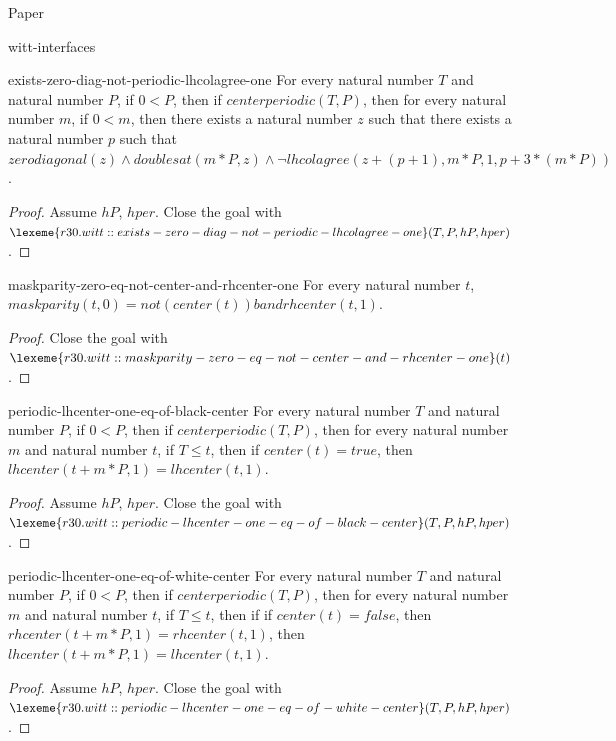 \begin{lexlean}{Paper}
\begin{section}{witt-interfaces}
  \begin{theorem}{exists-zero-diag-not-periodic-lhcolagree-one}
  For every natural number \(T\) and natural number \(P\), if \(0 < P\), then if \(centerperiodic(T, P)\), then for every natural number \(m\), if \(0 < m\), then there exists a natural number \(z\) such that there exists a natural number \(p\) such that \(zerodiagonal(z) ∧ doublesat(m * P, z) ∧ ¬lhcolagree(z + (p + 1), m * P, 1, p + 3 * (m * P))\).
  \begin{proof}
  Assume \(hP\), \(hper\).
  Close the goal with \(\lexeme{r30.witt::exists-zero-diag-not-periodic-lhcolagree-one}(T, P, hP, hper)\).
  \end{proof}
  \end{theorem}

  \begin{theorem}{maskparity-zero-eq-not-center-and-rhcenter-one}
  For every natural number \(t\), \(maskparity(t, 0) = not(center(t)) band rhcenter(t, 1)\).
  \begin{proof}
  Close the goal with \(\lexeme{r30.witt::maskparity-zero-eq-not-center-and-rhcenter-one}(t)\).
  \end{proof}
  \end{theorem}

  \begin{theorem}{periodic-lhcenter-one-eq-of-black-center}
  For every natural number \(T\) and natural number \(P\), if \(0 < P\), then if \(centerperiodic(T, P)\), then for every natural number \(m\) and natural number \(t\), if \(T ≤ t\), then if \(center(t) = true\), then \(lhcenter(t + m * P, 1) = lhcenter(t, 1)\).
  \begin{proof}
  Assume \(hP\), \(hper\).
  Close the goal with \(\lexeme{r30.witt::periodic-lhcenter-one-eq-of-black-center}(T, P, hP, hper)\).
  \end{proof}
  \end{theorem}

  \begin{theorem}{periodic-lhcenter-one-eq-of-white-center}
  For every natural number \(T\) and natural number \(P\), if \(0 < P\), then if \(centerperiodic(T, P)\), then for every natural number \(m\) and natural number \(t\), if \(T ≤ t\), then if if \(center(t) = false\), then \(rhcenter(t + m * P, 1) = rhcenter(t, 1)\), then \(lhcenter(t + m * P, 1) = lhcenter(t, 1)\).
  \begin{proof}
  Assume \(hP\), \(hper\).
  Close the goal with \(\lexeme{r30.witt::periodic-lhcenter-one-eq-of-white-center}(T, P, hP, hper)\).
  \end{proof}
  \end{theorem}


\end{section}
\end{lexlean}
